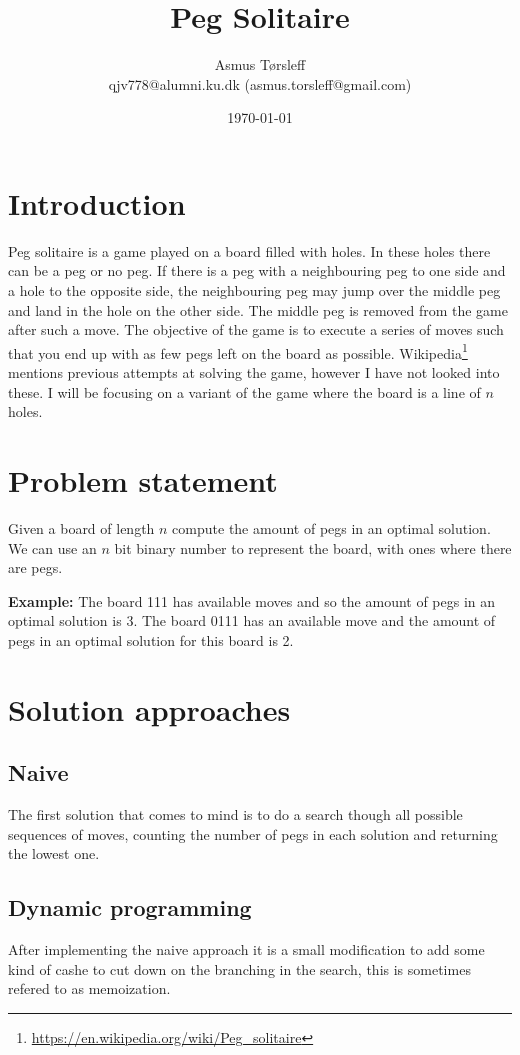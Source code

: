 \documentclass{article}
\title{Peg Solitaire}
\author{
\centering
\begin{tabular}{c}
    Asmus Tørsleff\\
    qjv778@alumni.ku.dk (asmus.torsleff@gmail.com)\\
\end{tabular}}
\date{\today}
\begin{document}
\maketitle
\section{Introduction}
Peg solitaire is a game played on a board filled with holes. In these holes there can be a peg or no peg. If there is a peg with a neighbouring peg to one side and a hole to the opposite side, the neighbouring peg may jump over the middle peg and land in the hole on the other side. The middle peg is removed from the game after such a move. The objective of the game is to execute a series of moves such that you end up with as few pegs left on the board as possible. Wikipedia\footnote{\url{https://en.wikipedia.org/wiki/Peg_solitaire}} mentions previous attempts at solving the game, however I have not looked into these. I will be focusing on a variant of the game where the board is a line of $n$ holes. 
\section{Problem statement}
Given a board of length $n$ compute the amount of pegs in an optimal solution. 
We can use an $n$ bit binary number to represent the board, with ones where there are pegs. 


\textbf{Example:} The board 111 has available moves and so the amount of pegs in an optimal solution is 3.  The board 0111 has an available move and the amount of pegs in an optimal solution for this board is 2. 

\section{Solution approaches}

\subsection{Naive}
The first solution that comes to mind is to do a search though all possible sequences of moves, counting the number of pegs in each solution and returning the lowest one. 

\subsection{Dynamic programming}
After implementing the naive approach it is a small modification to add some kind of cashe to cut down on the branching in the search, this is sometimes refered to as memoization. 
\end{document}
